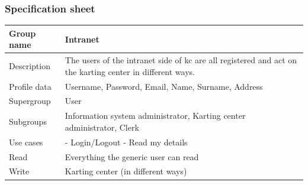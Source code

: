 \documentclass{beamer}
\begin{document}
\begin{frame}
    \frametitle{Specification sheet}
    \begin{table}
        \tiny
        \begin{tabular}{|p{2cm}|p{6cm}|}
        \hline
        Group name & \textbf{Intranet} \\
        \hline
        Description & The users of the intranet side of kc{} are 
        all registered and act on the karting center in different ways. \\
        \hline
        Profile data & Username, Password, Email, Name, Surname, Address \\
        \hline
        Supergroup & User \\
        \hline
        Subgroups & Information system administrator, Karting center administrator, Clerk \\
        \hline
        Use cases &
        - Login/Logout \newline
        - Read my details \\
        \hline
        Read & Everything the generic user can read \\
        \hline
        Write & Karting center (in different ways) \\
        \hline
        \end{tabular}
    \end{table}
\end{frame}
\end{document}
